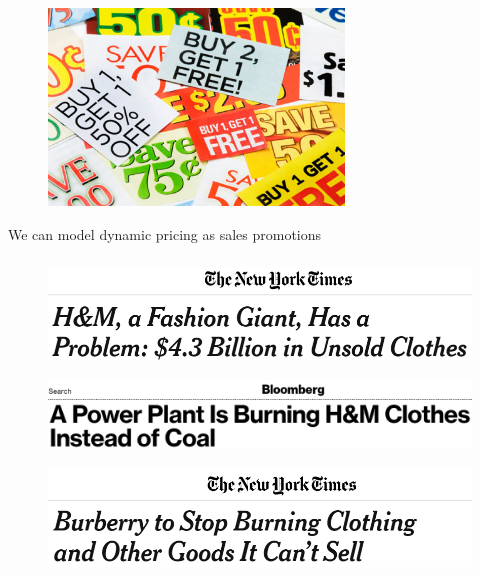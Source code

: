 \documentclass[11pt]{beamer}
\begin{document}
\begin{frame}
\frametitle{}
\begin{figure}[h]
\centering
\includegraphics[width=0.7\textwidth]{promos.png}
\end{figure}
\centering
We can model dynamic pricing as sales promotions
\end{frame}

\begin{frame}
\frametitle{}
\begin{figure}[h]
\centering
\includegraphics[width=1\textwidth]{hnm.png}
\end{figure}
\begin{figure}[h]
\centering
\includegraphics[width=1\textwidth]{bloomberg.png}
\end{figure}
\begin{figure}[h]
\centering
\includegraphics[width=1\textwidth]{burberry.png}
\end{figure}
\end{frame}
\end{document}
